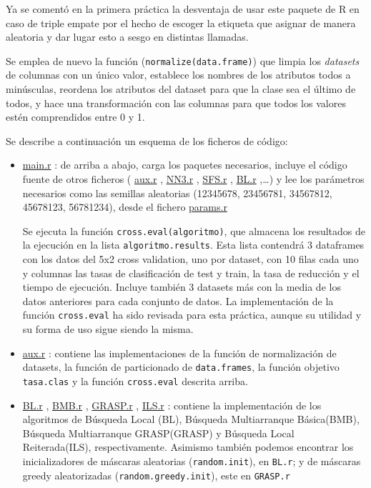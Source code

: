 \documentclass[a4paper,11pt]{article}
\newcommand{\hrefr}[1]{
\href{../bin/#1}{#1}
}
\begin{document}
Ya se comentó en la primera práctica la desventaja de usar este paquete de R en caso de triple empate por el hecho de
escoger la etiqueta que asignar de manera aleatoria y dar lugar esto a sesgo en distintas llamadas.

Se emplea de nuevo la función (\texttt{normalize(data.frame)}) que limpia los \textit{datasets} de columnas con
un único valor, establece los nombres de los atributos todos a minúsculas, reordena los atributos del dataset para que
la clase sea el último de todos, y hace una transformación con las columnas para que todos los valores estén comprendidos
entre 0 y 1.

Se describe a continuación un esquema de los ficheros de código:
\begin{itemize}
 \item \hrefr{main.r}: de arriba a abajo, carga los paquetes necesarios, incluye el código fuente de otros ficheros
  (\hrefr{aux.r}, \hrefr{NN3.r}, \hrefr{SFS.r}, \hrefr{BL.r},\ldots) y lee los parámetros necesarios como las 
  semillas aleatorias (12345678, 23456781, 34567812, 45678123, 56781234), desde el fichero \hrefr{params.r}
  
  Se ejecuta la función \texttt{cross.eval(algoritmo)}, que almacena los resultados de la ejecución en la lista
  \texttt{algoritmo.results}. Esta lista contendrá 3 dataframes con los datos del 5x2 cross validation, uno por dataset, 
  con 10 filas cada uno  y columnas las tasas de clasificación de test y train, la tasa de reducción y el tiempo de 
  ejecución. Incluye también 3 datasets más con la media de los datos anteriores para cada conjunto de datos. La implementación
  de la función \texttt{cross.eval} ha sido revisada para esta práctica, aunque su utilidad y su forma de uso sigue
  siendo la misma.
 
 \item \hrefr{aux.r}: contiene las implementaciones de la función de normalización de datasets, la función de
 particionado de \texttt{data.frames}, la función objetivo \texttt{tasa.clas} y la función \texttt{cross.eval}
 descrita arriba.
 
 \item \hrefr{BL.r}, \hrefr{BMB.r}, \hrefr{GRASP.r}, \hrefr{ILS.r}: contiene la implementación de los algoritmos de Búsqueda Local (BL), Búsqueda 
 Multiarranque Básica(BMB), Búsqueda Multiarranque GRASP(GRASP) y Búsqueda Local Reiterada(ILS), respectivamente. 
 Asimismo también podemos encontrar los inicializadores de máscaras aleatorias (\texttt{random.init}), en \texttt{BL.r};
 y de máscaras greedy aleatorizadas (\texttt{random.greedy.init}), este en \texttt{GRASP.r}
 

\end{itemize}
\end{document}
